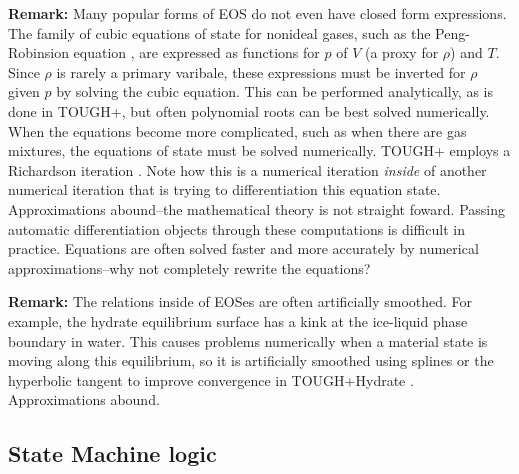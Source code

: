 \documentclass[]{article}
\begin{document}
{\bf Remark:} Many popular forms of EOS do not even have closed form
expressions. The family of cubic equations of state for nonideal
gases, such as the Peng-Robinsion equation \cite{peng_new_1976}, are
expressed as functions for $p$ of $V$ (a proxy for $\rho$) and
$T$. Since $\rho$ is rarely a primary varibale, these expressions must be inverted for
$\rho$ given $p$ by solving the cubic equation. This can be performed
analytically, as is done in TOUGH+, but often polynomial roots can
be best solved numerically. When the equations become more
complicated, such as when there are gas mixtures, the equations of
state must be solved numerically. TOUGH+ employs a Richardson
iteration \cite{moridis_users_2014-2}.
Note how this is a numerical
iteration {\em inside} of another numerical iteration that is trying
to differentiation this equation state. Approximations
abound--the mathematical theory is not straight foward. Passing
automatic differentiation objects through these computations is
difficult in practice. Equations are
often solved faster and more accurately by numerical
approximations--why not completely rewrite the equations?

{\bf Remark:} The relations inside of EOSes are often artificially
smoothed. For example, the hydrate equilibrium surface has a kink at
the ice-liquid phase boundary in water. This causes problems
numerically when a material state is moving along this equilibrium, so
it is artificially smoothed using splines or the hyperbolic tangent to
improve convergence in TOUGH+Hydrate \cite{moridis_users_2014}. Approximations abound. 


\hypertarget{header-n3253}{%
\subsection{State Machine logic}\label{header-n3253}}
\end{document}
